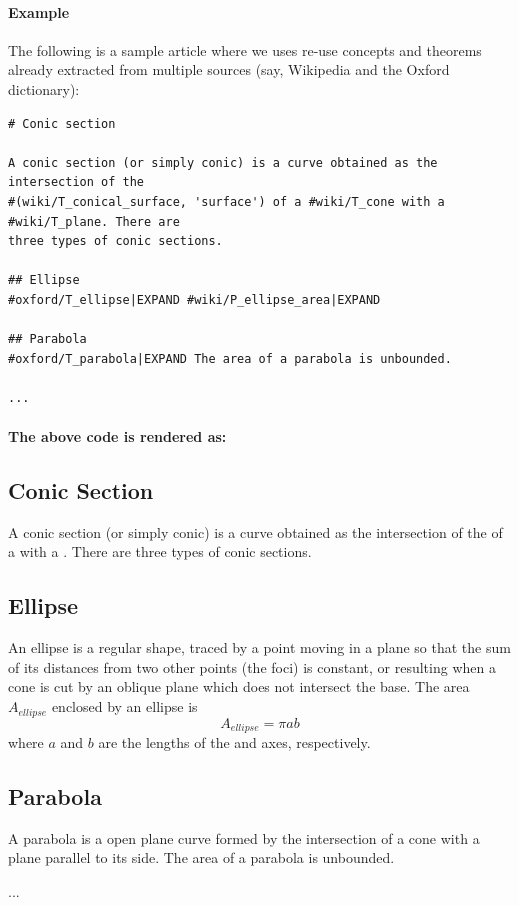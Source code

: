 \documentclass[a4paper]{article}
\begin{document}
\paragraph{Example}
The following is a sample article where we uses re-use concepts and theorems already extracted from multiple sources (say, Wikipedia and the Oxford dictionary):

\begin{verbatim}
# Conic section

A conic section (or simply conic) is a curve obtained as the intersection of the
#(wiki/T_conical_surface, 'surface') of a #wiki/T_cone with a #wiki/T_plane. There are
three types of conic sections.

## Ellipse
#oxford/T_ellipse|EXPAND #wiki/P_ellipse_area|EXPAND

## Parabola
#oxford/T_parabola|EXPAND The area of a parabola is unbounded.

...

\end{verbatim}

\paragraph{The above code is rendered as:}
\begin{mdframed}
\section*{Conic Section}
A conic section (or simply conic) is a curve obtained as the intersection of the  of a  with a . There are three types of conic sections.

\subsection*{Ellipse}
An ellipse is a regular  shape, traced by a point moving in a plane so that the sum of its distances from two other points (the foci) is constant, or resulting when a cone is cut by an oblique plane which does not intersect the base.  The area $A_{ellipse}$ enclosed by an ellipse is $$A_{ellipse} = \pi a b$$where $a$ and $b$ are the lengths of the  and  axes, respectively.

\subsection*{Parabola}
A parabola is a  open plane curve formed by the intersection of a cone with a plane parallel to its side. The area of a parabola is unbounded.

...

\end{mdframed}
\end{document}
